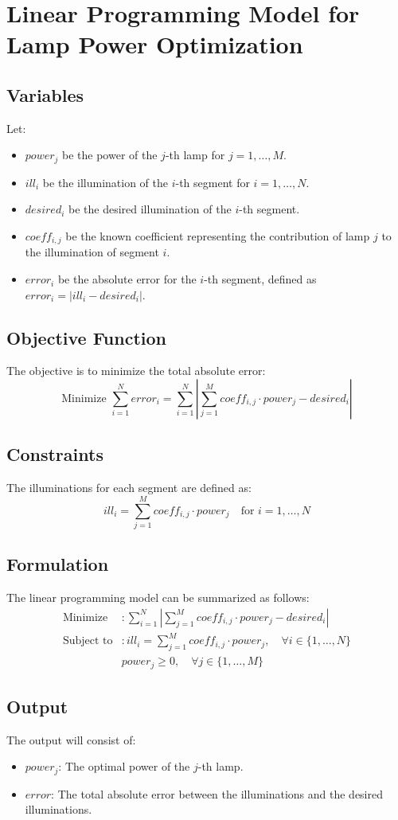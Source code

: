 \documentclass{article}
\begin{document}
\section*{Linear Programming Model for Lamp Power Optimization}

\subsection*{Variables}
Let:
\begin{itemize}
    \item \( power_j \) be the power of the \( j \)-th lamp for \( j = 1, \ldots, M \).
    \item \( ill_i \) be the illumination of the \( i \)-th segment for \( i = 1, \ldots, N \).
    \item \( desired_i \) be the desired illumination of the \( i \)-th segment.
    \item \( coeff_{i,j} \) be the known coefficient representing the contribution of lamp \( j \) to the illumination of segment \( i \).
    \item \( error_i \) be the absolute error for the \( i \)-th segment, defined as \( error_i = |ill_i - desired_i| \).
\end{itemize}

\subsection*{Objective Function}
The objective is to minimize the total absolute error:
\[
\text{Minimize } \sum_{i=1}^{N} error_i = \sum_{i=1}^{N} | \sum_{j=1}^{M} coeff_{i,j} \cdot power_j - desired_i |
\]

\subsection*{Constraints}
The illuminations for each segment are defined as:
\[
ill_i = \sum_{j=1}^{M} coeff_{i,j} \cdot power_j \quad \text{for } i = 1, \ldots, N
\]

\subsection*{Formulation}
The linear programming model can be summarized as follows:
\begin{align*}
\text{Minimize} &: \sum_{i=1}^{N} | \sum_{j=1}^{M} coeff_{i,j} \cdot power_j - desired_i | \\
\text{Subject to} &: ill_i = \sum_{j=1}^{M} coeff_{i,j} \cdot power_j, \quad \forall i \in \{1, \ldots, N\} \\
& power_j \geq 0, \quad \forall j \in \{1, \ldots, M\}
\end{align*}

\subsection*{Output}
The output will consist of:
\begin{itemize}
    \item \( power_j \): The optimal power of the \( j \)-th lamp.
    \item \( error \): The total absolute error between the illuminations and the desired illuminations.
\end{itemize}
\end{document}
